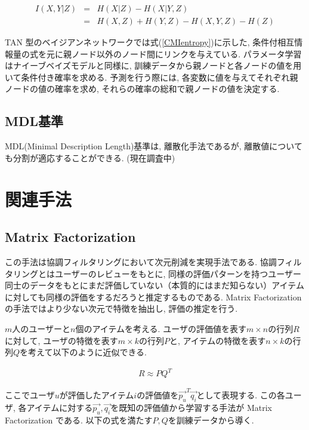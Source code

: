 \documentclass[a4paper]{jarticle}
\begin{document}
\begin{eqnarray}
\label{CMIentropy}
I(X, Y | Z) &=& H(X| Z) - H(X| Y, Z) \nonumber \\
               &=& H(X, Z) + H(Y, Z) - H(X, Y, Z) - H(Z)
\end{eqnarray}

TAN 型のベイジアンネットワークでは式(\ref{CMIentropy})に示した, 条件付相互情報量の式を元に親ノード以外のノード間にリンクを与えている. パラメータ学習はナイーブベイズモデルと同様に,  訓練データから親ノードと各ノードの値を用いて条件付き確率を求める. 予測を行う際には, 各変数に値を与えてそれぞれ親ノードの値の確率を求め, それらの確率の総和で親ノードの値を決定する.

\subsection{MDL基準}

MDL(Minimal Description Length)基準は, 離散化手法であるが, 離散値についても分割が適応することができる. (現在調査中)

\section{関連手法}

\subsection{Matrix Factorization}

この手法は協調フィルタリングにおいて次元削減を実現手法である. 協調フィルタリングとはユーザーのレビューをもとに, 同様の評価パターンを持つユーザー同士のデータをもとにまだ評価していない（本質的にはまだ知らない）アイテムに対しても同様の評価をするだろうと推定するものである. Matrix Factorization の手法ではより少ない次元で特徴を抽出し, 評価の推定を行う.~\cite{Koren}

$m$人のユーザーと$n$個のアイテムを考える. ユーザの評価値を表す$m \times n$の行列$R$に対して, ユーザの特徴を表す$m \times k$の行列$P$と, アイテムの特徴を表す$n \times k$の行列$Q$を考えて以下のように近似できる.

\begin{eqnarray}
R \approx P  Q^T
\end{eqnarray}

ここでユーザ$u$が評価したアイテム$i$の評価値を$\vec{p_u}^T \vec{q_i}$として表現する. この各ユーザ, 各アイテムに対する$\vec{p_u}, \vec{q_i}$を既知の評価値から学習する手法が Matrix Factorization である. 以下の式を満たす$P, Q$を訓練データから導く.
\end{document}
